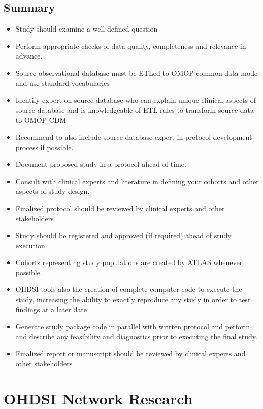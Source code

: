 \documentclass[11pt]{book}
\providecommand{\tightlist}{%
  \setlength{\itemsep}{0pt}\setlength{\parskip}{0pt}}
\theoremstyle{definition}
\theoremstyle{definition}
\theoremstyle{definition}
\theoremstyle{remark}
\let\BeginKnitrBlock\begin \let\EndKnitrBlock\end
\begin{document}
\hypertarget{summary-14}{%
\section{Summary}\label{summary-14}}

\BeginKnitrBlock{rmdsummary}
\begin{itemize}
\tightlist
\item
  Study should examine a well defined question
\item
  Perform appropriate checks of data quality, completeness and relevance in advance.
\item
  Source observational database must be ETLed to OMOP common data mode and use standard vocabularies
\item
  Identify expert on source database who can explain unique clinical aspects of source database and is knowledgeable of ETL rules to transform source data to OMOP CDM
\item
  Recommend to also include source database expert in protocol development process if possible.
\item
  Document proposed study in a protocol ahead of time.
\item
  Consult with clinical experts and literature in defining your cohorts and other aspects of study design.
\item
  Finalized protocol should be reviewed by clinical experts and other stakeholders
\item
  Study should be registered and approved (if required) ahead of study execution.
\item
  Cohorts representing study populations are created by ATLAS whenever possible.
\item
  OHDSI tools also the creation of complete computer code to execute the study, increasing the ability to exactly reproduce any study in order to test findings at a later date
\item
  Generate study package code in parallel with written protocol and perform and describe any feasibility and diagnostics prior to executing the final study.
\item
  Finalized report or manuscript should be reviewed by clinical experts and other stakeholders
\end{itemize}
\EndKnitrBlock{rmdsummary}

\hypertarget{NetworkResearch}{%
\chapter{OHDSI Network Research}\label{NetworkResearch}}
\end{document}
